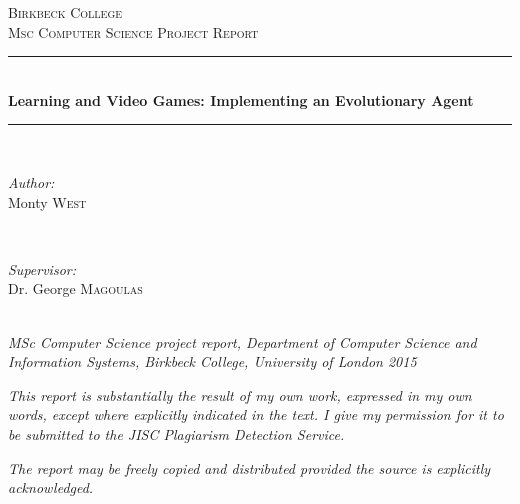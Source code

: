\documentclass[a4paper, 11pt]{article}
\begin{document}
\begin{titlepage}
\newcommand{\HRule}{\rule{\linewidth}{0.5mm}}
\center

\textsc{\LARGE Birkbeck College}\\[1.5cm] %

\textsc{\Large Msc Computer Science Project Report}

\HRule \\[0.4cm]
{ \LARGE \bfseries Learning and Video Games: Implementing an Evolutionary Agent}\\[0.4cm] %
\HRule \\[1.5cm]


\begin{minipage}{0.4\textwidth}
\begin{flushleft} \large
\emph{Author:}\\
Monty \textsc{West} %
\end{flushleft}
\end{minipage}
~
\begin{minipage}{0.4\textwidth}
\begin{flushright} \large
\emph{Supervisor:} \\
Dr. George \textsc{Magoulas} %
\end{flushright}
\end{minipage}\\[4cm]

\emph{MSc Computer Science project report, Department of
Computer Science and Information Systems, Birkbeck College,
University of London 2015}

\vspace{5mm}

\emph{This report is substantially the result of my own work,
expressed in my own words, except where explicitly indicated in
the text. I give my permission for it to be submitted to the
JISC Plagiarism Detection Service.}

\vspace{5mm}

\emph{The report may be freely copied and distributed provided the
source is explicitly acknowledged.}

\end{titlepage}
\end{document}
